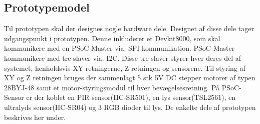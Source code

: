 \subsection{Prototypemodel}

Til prototypen skal der designes nogle hardware dele. Designet af disse dele tager udgangspunkt i prototypen. Denne inkluderer et Devkit8000, som skal kommunikere med en PSoC-Master via. SPI kommunikation. PSoC-Master kommunikere med tre slaver via. I2C. Disse tre slaver styrer hver deres del af systemet, henholdsvis XY retningerne, Z retningen og sensorene.
\newline Til styring af XY og Z retningen bruges der sammenlagt 5 stk 5V DC stepper motorer af typen 28BYJ-48 samt et motor-styringsmodul til hver bevægelsesretning. 
\newline På PSoC-Sensor er der koblet en PIR sensor(HC-SR501), en lys sensor(TSL2561), en ultralyds sensor(HC-SR04) og 3 RGB dioder til lys.
\newline De enkelte dele af prototypen beskrives her under. 
